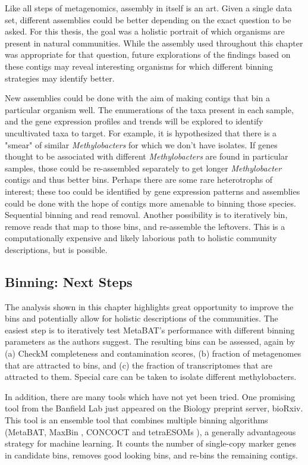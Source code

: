 Like all steps of metagenomics, assembly in itself is an art.
Given a single data set, different assemblies could be better depending on the exact question to be asked.
For this thesis, the goal was a holistic portrait of which organisms are present in natural communities.
While the assembly used throughout this chapter was appropriate for that question, future explorations of the findings based on these contigs may reveal interesting organisms for which different binning strategies may identify better.

New assemblies could be done with the aim of making contigs that bin a particular organism well.
The enumerations of the taxa present in each sample, and the gene expression profiles and trends will be explored to identify uncultivated taxa to target.
For example, it is hypothesized that there is a "smear" of similar \textit{Methylobacters} for which we don't have isolates.
If genes thought to be associated with different \textit{Methylobacters} are found in particular samples, those could be re-assembled separately to get longer \textit{Methylobacter} contigs and thus better bins.
Perhaps there are some rare heterotrophs of interest; these too could be identified by gene expression patterns and assemblies could be done with the hope of contigs more amenable to binning those species.
Sequential binning and read removal.
Another possibility is to iteratively bin, remove reads that map to those bins, and re-assemble the leftovers.
This is a computationally expensive and likely laborious path to holistic community descriptions, but is possible.

\subsection{Binning: Next Steps}

The analysis shown in this chapter highlights great opportunity to improve the bins and potentially allow for holistic descriptions of the communities.
The easiest step is to iteratively test MetaBAT's performance with different binning parameters as the authors suggest.
The resulting bins can be assessed, again by (a) CheckM completeness and contamination scores, (b) fraction of metagenomes that are attracted to bins, and (c) the fraction of transcriptomes that are attracted to them.
Special care can be taken to isolate different methylobacters.

In addition, there are many tools which have not yet been tried.
One promising tool from the Banfield Lab \cite{sieber2017} just appeared on the Biology preprint server, bioRxiv.
This tool is an ensemble tool that combines multiple binning algorithms (MetaBAT\cite{metabat2015}, MaxBin \cite{wu2015}, CONCOCT \cite{concoct2014} and tetraESOMs \cite{dick2009}), a generally advantageous strategy for machine learning.
It counts the number of single-copy marker genes in candidate bins, removes good looking bins, and re-bins the remaining contigs.


